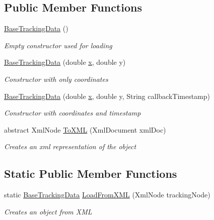 \subsection*{Public Member Functions}
\begin{DoxyCompactItemize}
\item 
\hyperlink{class_web_analyzer_1_1_models_1_1_base_1_1_base_tracking_data_a2963b17bffe021ad55b9f237f2df8b33}{Base\+Tracking\+Data} ()
\begin{DoxyCompactList}\small\item\em Empty constructor used for loading \end{DoxyCompactList}\item 
\hyperlink{class_web_analyzer_1_1_models_1_1_base_1_1_base_tracking_data_a696296a69335086be6efcb5ab1ee2a4e}{Base\+Tracking\+Data} (double \hyperlink{_u_i_2_h_t_m_l_resources_2js_2lib_2underscore_8min_8js_a81e910173af87b1161e719a504d52407}{x}, double y)
\begin{DoxyCompactList}\small\item\em Constructor with only coordinates \end{DoxyCompactList}\item 
\hyperlink{class_web_analyzer_1_1_models_1_1_base_1_1_base_tracking_data_a6d087c8e01aa10dda54d09ba814f668d}{Base\+Tracking\+Data} (double \hyperlink{_u_i_2_h_t_m_l_resources_2js_2lib_2underscore_8min_8js_a81e910173af87b1161e719a504d52407}{x}, double y, String callback\+Timestamp)
\begin{DoxyCompactList}\small\item\em Constructor with coordinates and timestamp \end{DoxyCompactList}\item 
abstract Xml\+Node \hyperlink{class_web_analyzer_1_1_models_1_1_base_1_1_base_tracking_data_a461cc41b4d928c47a376aa6ea76a1b91}{To\+X\+M\+L} (Xml\+Document xml\+Doc)
\begin{DoxyCompactList}\small\item\em Creates an xml representation of the object \end{DoxyCompactList}\end{DoxyCompactItemize}
\subsection*{Static Public Member Functions}
\begin{DoxyCompactItemize}
\item 
static \hyperlink{class_web_analyzer_1_1_models_1_1_base_1_1_base_tracking_data}{Base\+Tracking\+Data} \hyperlink{class_web_analyzer_1_1_models_1_1_base_1_1_base_tracking_data_a5c26d1acf65693fe2cc9f48b5b8f3db6}{Load\+From\+X\+M\+L} (Xml\+Node tracking\+Node)
\begin{DoxyCompactList}\small\item\em Creates an object from X\+M\+L \end{DoxyCompactList}\end{DoxyCompactItemize}
